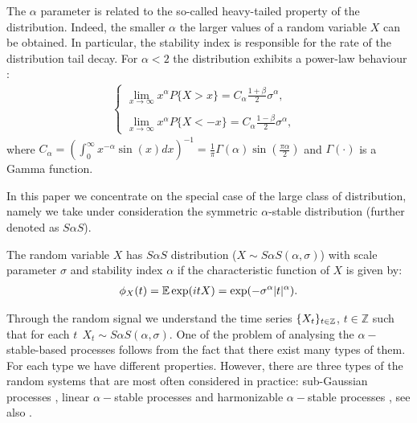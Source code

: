 The $\alpha$ parameter is related to the so-called heavy-tailed property of the distribution. Indeed, the smaller $\alpha$  the larger values of a random variable $X$ can be obtained.
In particular, the stability index is responsible for the rate of the distribution tail decay. For $\alpha<2$ the \stab distribution exhibits a power-law behaviour \cite{stable}:
\begin{eqnarray}\label{eq:power}
\left\{ 
\begin{array}{ll} 
\lim_{x\to\infty} x^{\alpha}P\{X>x\}=C_{\alpha}\frac{1+\beta}{2}\sigma^\alpha,\\
&\\
\lim_{x\to{}\infty} x^{\alpha}P\{X<-x\}=C_{\alpha}\frac{1-\beta}{2}\sigma^\alpha,
\end{array}\right.
\end{eqnarray}
where $C_{\alpha}=\left(\int_0^{\infty}x^{-\alpha}\sin(x)dx\right)^{-1}=\frac{1}{\pi} \Gamma (\alpha)\sin (\frac{\pi \alpha}{2})$ and $\Gamma(\cdot)$ is a Gamma function.

In this paper we concentrate on the special case of the large class of \stab distribution, namely we take under consideration the symmetric $\alpha$-stable distribution (further denoted as $S\alpha S$).
\begin{definition}
\label{def7}\cite{stable}
The random variable $X$ has $S\alpha S$ distribution ($X\sim S\alpha S(\alpha,\sigma)$) with scale parameter $\sigma$ and stability index $\alpha$ if the characteristic function of $X$  is given by:
\begin{eqnarray}\label{char}
\phi_{X}(t)=\operatorname{\mathbb{E}}\exp(itX)=\exp(-\sigma^{\alpha}|t|^{\alpha}).
\end{eqnarray}
\end{definition}
Through the \stab random signal we understand the 
time series $\{X_t\}_{t\in \mathbb{Z}}$, $t\in \mathbb{Z}$ such that for each $t~~X_t\sim S\alpha S(\alpha,\sigma)$.
One of the problem of analysing the $\alpha-$stable-based processes follows from the fact that there exist many types of them. For each type we have different properties.  However, there are three types of the \stab random systems that are most often considered in practice: sub-Gaussian processes \cite{cambanis_soltani}, linear $\alpha-$stable processes \cite{kluppelberg1993spectral,klup1994,klup1995,klup1996,nw1,nowicka2006dependence} and harmonizable $\alpha-$stable processes \cite{cambnnis1981linear,weron1985,makagon_mandrekar1990}, see also \cite{shao,stable}.


